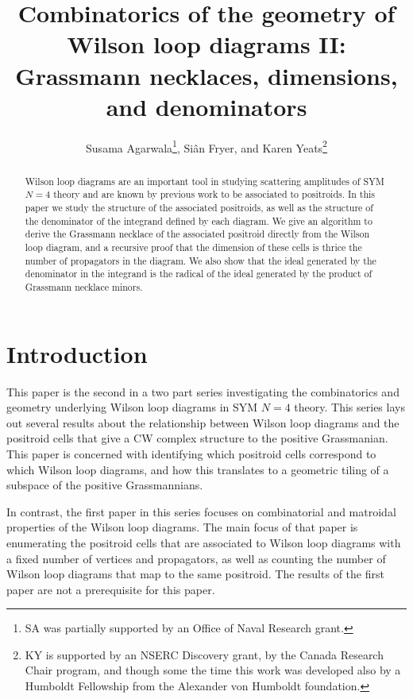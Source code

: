 \documentclass[11pt]{article}
\title{Combinatorics of the geometry of Wilson loop diagrams II: Grassmann necklaces, dimensions, and denominators}
\author{Susama Agarwala\thanks{SA was partially supported by an Office of Naval Research grant.}, Si\^an Fryer, and Karen Yeats\thanks{KY is supported by an NSERC Discovery grant, by the Canada Research Chair program, and though some the time this work was developed also by a Humboldt Fellowship from the Alexander von Humboldt foundation.}}
\date{}
\theoremstyle{remark}
\theoremstyle{definition}
\begin{document}
\maketitle

\begin{abstract}
  Wilson loop diagrams are an important tool in studying scattering amplitudes of SYM $N=4$ theory and are known by previous work to be associated to positroids. In this paper we study the structure of the associated positroids, as well as the structure of the denominator of the integrand defined by each diagram. We give an algorithm to derive the Grassmann necklace of the associated positroid directly from the Wilson loop diagram, and a recursive proof that the dimension of these cells is thrice the number of propagators in the diagram. We also show that the ideal generated by the denominator in the integrand is the radical of the ideal generated by the product of Grassmann necklace minors.
\end{abstract}
\section{Introduction}


This paper is the second in a two part series investigating the combinatorics and geometry underlying Wilson loop diagrams in SYM $N=4$ theory. This series lays out several results about the relationship between Wilson loop diagrams and the positroid cells that give a CW complex structure to the positive Grassmanian. This paper is concerned with identifying which positroid cells correspond to which Wilson loop diagrams, and how this translates to a geometric tiling of a subspace of the positive Grassmannians. 



In contrast, the first paper in this series focuses on combinatorial and matroidal properties of the Wilson loop diagrams. The main focus of that paper is enumerating the positroid cells that are associated to Wilson loop diagrams with a fixed number of vertices and propagators, as well as counting the number of Wilson loop diagrams that map to the same positroid. The results of the first paper are not a prerequisite for this paper.
\end{document}
